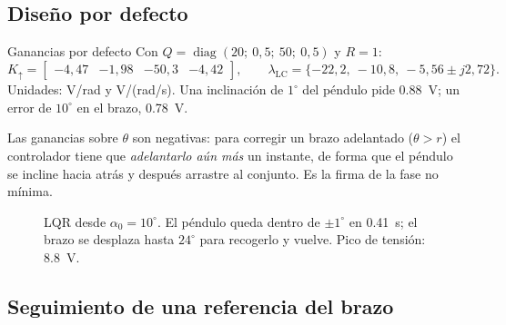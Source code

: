 \subsection{Diseño por defecto}

\begin{ejemplo}{Ganancias por defecto}
Con $Q=\operatorname{diag}(20;\ 0{,}5;\ 50;\ 0{,}5)$ y $R=1$:
\[
K_\uparrow=\begin{bmatrix}-4{,}47 & -1{,}98 & -50{,}3 & -4{,}42\end{bmatrix},\qquad
\lambda_{\text{LC}}=\{-22{,}2,\ -10{,}8,\ -5{,}56\pm j2{,}72\}.
\]
Unidades: V/rad y V/(rad/s). Una inclinación de $1^\circ$ del péndulo pide \SI{0.88}{V}; un error de $10^\circ$ en el brazo, \SI{0.78}{V}.
\end{ejemplo}

Las ganancias sobre $\theta$ son negativas: para corregir un brazo adelantado ($\theta>r$) el controlador tiene que \emph{adelantarlo aún más} un instante, de forma que el péndulo se incline hacia atrás y después arrastre al conjunto. Es la firma de la fase no mínima.

\begin{figure}[H]
\centering
{}
\caption{LQR desde $\alpha_0=10^\circ$. El péndulo queda dentro de $\pm1^\circ$ en \SI{0.41}{s}; el brazo se desplaza hasta $24^\circ$ para recogerlo y vuelve. Pico de tensión: \SI{8.8}{V}.}
\label{fig:lqric}
\end{figure}

\subsection{Seguimiento de una referencia del brazo}

